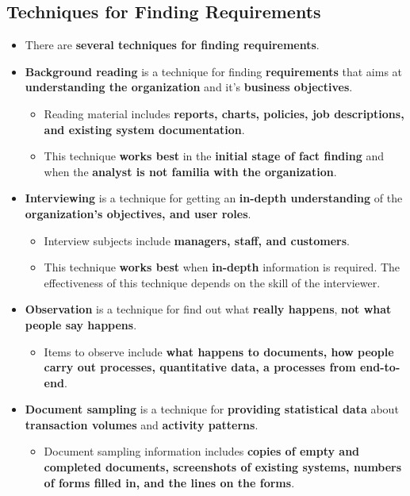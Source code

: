 \documentclass[16pt]{article}
\begin{document}
    \subsection*{Techniques for Finding Requirements}
    \begin{itemize}
        \item There are \textbf{several techniques for finding requirements}.
        \item \textbf{Background reading} is a technique for finding \textbf{requirements} that aims at \textbf{understanding the organization} and it's \textbf{business objectives}.
        \begin{itemize}
            \item Reading material includes \textbf{reports, charts, policies, job descriptions, and existing system documentation}.
            \item This technique \textbf{works best} in the \textbf{initial stage of fact finding} and when the \textbf{analyst is not familia with the organization}.
        \end{itemize}
        \item \textbf{Interviewing} is a technique for getting an \textbf{in-depth understanding} of the \textbf{organization's objectives, and user roles}.
        \begin{itemize}
            \item Interview subjects include \textbf{managers, staff, and customers}.
            \item This technique \textbf{works best} when \textbf{in-depth} information is required. The effectiveness of this technique depends on the skill of the interviewer.
        \end{itemize}
        \item \textbf{Observation} is a technique for find out what \textbf{really happens}, \textbf{not what people say happens}.
        \begin{itemize}
            \item Items to observe include \textbf{what happens to documents, how people carry out processes, quantitative data, a processes from end-to-end}.
        \end{itemize}
        \item \textbf{Document sampling} is a technique for \textbf{providing statistical data} about \textbf{transaction volumes} and \textbf{activity patterns}.
        \begin{itemize}
            \item Document sampling information includes \textbf{copies of empty and completed documents, screenshots of existing systems, numbers of forms filled in, and the lines on the forms}. 

\end{itemize}
\end{itemize}
\end{document}
